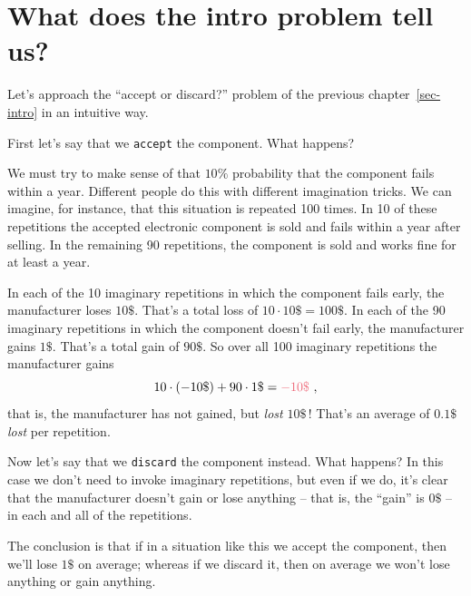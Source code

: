 \documentclass[
  a4paper,
  DIV=11,
  numbers=noendperiod,
  oneside]{scrreprt}
\begin{document}
\hypertarget{what-does-the-intro-problem-tell-us}{%
\section{What does the intro problem tell
us?}\label{what-does-the-intro-problem-tell-us}}

Let's approach the ``accept or discard?'' problem of the previous
chapter~\ref{sec-intro} in an intuitive way.


First let's say that we \texttt{accept} the component. What happens?

We must try to make sense of that \(10\%\) probability that the
component fails within a year. Different people do this with different
imagination tricks. We can imagine, for instance, that this situation is
repeated 100 times. In 10 of these repetitions the accepted electronic
component is sold and fails within a year after selling. In the
remaining 90 repetitions, the component is sold and works fine for at
least a year.

In each of the 10 imaginary repetitions in which the component fails
early, the manufacturer loses \(10\$\). That's a total loss of
\(10 \cdot 10\$ = 100\$\). In each of the 90 imaginary repetitions in
which the component doesn't fail early, the manufacturer gains \(1\$\).
That's a total gain of \(90\$\). So over all 100 imaginary repetitions
the manufacturer gains \[
10\cdot (-10\$) + 90\cdot 1\$ = {\color[RGB]{238,102,119} -10\$} \ ,
\] that is, the manufacturer has not gained, but \emph{lost} \(10\$\)\,!
That's an average of \(0.1\$\) \emph{lost} per repetition.

Now let's say that we \texttt{discard} the component instead. What
happens? In this case we don't need to invoke imaginary repetitions, but
even if we do, it's clear that the manufacturer doesn't gain or lose
anything -- that is, the ``gain'' is \(0\$\) -- in each and all of the
repetitions.

The conclusion is that if in a situation like this we {accept} the
component, then we'll {lose \(1\$\)} on average; whereas if we {discard}
it, then on average we won't {lose anything or gain anything}.
\end{document}
